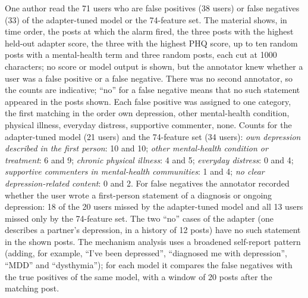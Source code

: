 \documentclass[11pt]{article}
\begin{document}
One author read the 71 users who are false positives (38 users) or false negatives (33) of the adapter-tuned model or the 74-feature set.
The material shows, in time order, the posts at which the alarm fired, the three posts with the highest held-out adapter score, the three with the highest PHQ score, up to ten random posts with a mental-health term and three random posts, each cut at 1000 characters; no score or model output is shown, but the annotator knew whether a user was a false positive or a false negative.
There was no second annotator, so the counts are indicative; ``no'' for a false negative means that no such statement appeared in the posts shown.
Each false positive was assigned to one category, the first matching in the order own depression, other mental-health condition, physical illness, everyday distress, supportive commenter, none.
Counts for the adapter-tuned model (21 users) and the 74-feature set (34 users):
\emph{own depression described in the first person}: 10 and 10;
\emph{other mental-health condition or treatment}: 6 and 9;
\emph{chronic physical illness}: 4 and 5;
\emph{everyday distress}: 0 and 4;
\emph{supportive commenters in mental-health communities}: 1 and 4;
\emph{no clear depression-related content}: 0 and 2.
For false negatives the annotator recorded whether the user wrote a first-person statement of a diagnosis or ongoing depression: 18 of the 20 users missed by the adapter-tuned model and all 13 users missed only by the 74-feature set.
The two ``no'' cases of the adapter (one describes a partner's depression, in a history of 12 posts) have no such statement in the shown posts.
The mechanism analysis uses a broadened self-report pattern (adding, for example, ``I've been depressed'', ``diagnosed me with depression'', ``MDD'' and ``dysthymia''); for each model it compares the false negatives with the true positives of the same model, with a window of 20 posts after the matching post.
\end{document}
